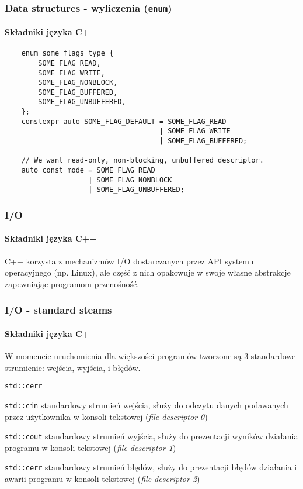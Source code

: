 \documentclass[aspectratio=169]{beamer}
\begin{document}
\begin{frame}[fragile]
    \frametitle{Data structures - wyliczenia ({\tt enum})}
    \framesubtitle{Składniki języka C++}

    {\scriptsize
    \begin{lstlisting}
    enum some_flags_type {
        SOME_FLAG_READ,
        SOME_FLAG_WRITE,
        SOME_FLAG_NONBLOCK,
        SOME_FLAG_BUFFERED,
        SOME_FLAG_UNBUFFERED,
    };
    constexpr auto SOME_FLAG_DEFAULT = SOME_FLAG_READ
                                     | SOME_FLAG_WRITE
                                     | SOME_FLAG_BUFFERED;

    // We want read-only, non-blocking, unbuffered descriptor.
    auto const mode = SOME_FLAG_READ
                    | SOME_FLAG_NONBLOCK
                    | SOME_FLAG_UNBUFFERED;
    \end{lstlisting}}
\end{frame}

\begin{frame}
    \frametitle{I/O}
    \framesubtitle{Składniki języka C++}

    C++ korzysta z mechanizmów I/O dostarczanych przez API systemu operacyjnego
    (np. Linux), ale część z nich opakowuje w swoje własne abstrakcje
    zapewniając programom przenośność.
\end{frame}

\begin{frame}
    \frametitle{I/O - standard steams}
    \framesubtitle{Składniki języka C++}

    W momencie uruchomienia dla większości programów tworzone są 3 standardowe
    strumienie: wejścia, wyjścia, i błędów.

    \begin{labeling}{{\tt std::cerr}}
    \item[{\tt std::cin}] standardowy strumień wejścia, służy do odczytu danych
        podawanych przez użytkownika w konsoli tekstowej (\emph{file descriptor
        0})
    \item[{\tt std::cout}] standardowy strumień wyjścia, służy do prezentacji
        wyników działania programu w konsoli tekstowej (\emph{file descriptor
        1})
    \item[{\tt std::cerr}] standardowy strumień błędów, służy do prezentacji
        błędów działania i awarii programu w konsoli tekstowej (\emph{file
        descriptor 2})
    \end{labeling}
\end{frame}
\end{document}
